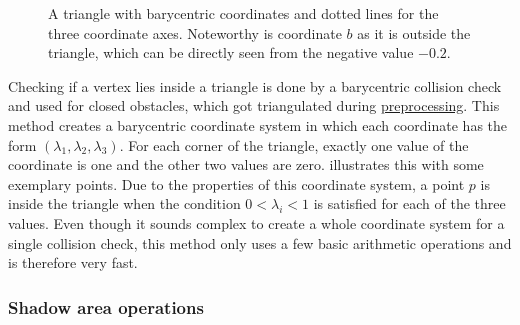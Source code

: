 			\begin{figure}[h]
				\begin{figcenter}
				\end{figcenter}
				\caption{A triangle with barycentric coordinates and dotted lines for the three coordinate axes. Noteworthy is coordinate $b$ as it is outside the triangle, which can be directly seen from the negative value $-0.2$.}
				\label{fig:barycentric-triangle}
			\end{figure}
			
			Checking if a vertex lies inside a triangle is done by a barycentric collision check and used for closed obstacles, which got triangulated during \hyperref[subsec:step-1-preprocessing]{preprocessing}.
			This method creates a barycentric coordinate system in which each coordinate has the form $(\lambda_1,\lambda_2,\lambda_3)$.
			For each corner of the triangle, exactly one value of the coordinate is one and the other two values are zero.
			 illustrates this with some exemplary points.
			Due to the properties of this coordinate system, a point $p$ is inside the triangle when the condition $0 < \lambda_i < 1$ is satisfied for each of the three values.
			Even though it sounds complex to create a whole coordinate system for a single collision check, this method only uses a few basic arithmetic operations and is therefore very fast.
			
		\subsubsection{Shadow area operations}
			
